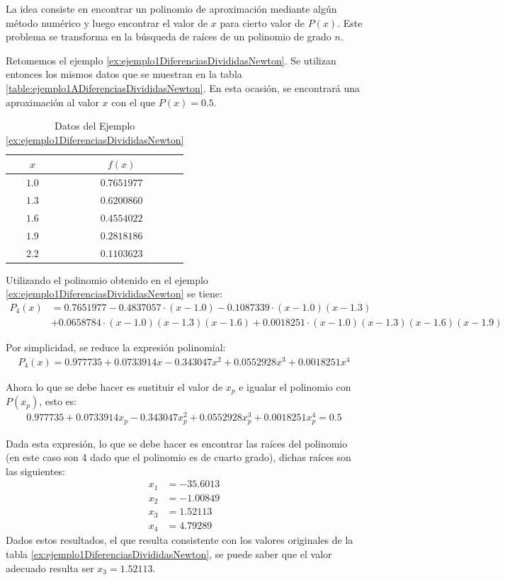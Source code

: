 La idea consiste en encontrar un polinomio de aproximación mediante algún método numérico y luego encontrar el valor de $x$ para cierto valor de $P(x)$. Este
problema se transforma en la búsqueda de raíces de un polinomio de grado $n$.

\begin{example}{\rm
Retomemos el ejemplo \ref{ex:ejemplo1DiferenciasDivididasNewton}. Se utilizan entonces los mismos datos que se muestran en la tabla
\ref{table:ejemplo1ADiferenciasDivididasNewton}. En esta ocasión, se encontrará una aproximación al valor $x$ con el que $P(x)=0.5$.
\begin{table}[H]
		\centering
      \begin{tabular}{|c|c|}
				\hline 
				\rowcolor[gray]{0.9} $x$ & $f(x)$\\ \hline
					$1.0$ & $0.7651977$ \\
					$1.3$ & $0.6200860$ \\
					$1.6$ & $0.4554022$ \\
					$1.9$ & $0.2818186$ \\
					$2.2$ & $0.1103623$ \\
				\hline
      	\end{tabular}
      	\caption{Datos del Ejemplo \ref{ex:ejemplo1DiferenciasDivididasNewton}}
	\end{table}
Utilizando el polinomio obtenido en el ejemplo \ref{ex:ejemplo1DiferenciasDivididasNewton} se tiene:
\begin{align*}
	P_4(x) &= 0.7651977 - 0.4837057\cdot(x-1.0) - 0.1087339\cdot(x-1.0)(x-1.3)\\ 
	&+ 0.0658784\cdot(x-1.0)(x-1.3)(x-1.6) + 0.0018251\cdot(x-1.0)(x-1.3)(x-1.6)(x-1.9)
\end{align*}

Por simplicidad, se reduce la expresión polinomial:
\begin{align*}
	P_4(x)=0.977735 + 0.0733914 x - 0.343047 x^2 + 0.0552928 x^3 + 0.0018251 x^4
\end{align*}

Ahora lo que se debe hacer es sustituir el valor de $x_p$ e igualar el polinomio con $P(x_p)$, esto es:
\begin{align*}
	0.977735 + 0.0733914 x_p - 0.343047 x_p^2 + 0.0552928 x_p^3 + 0.0018251 x_p^4 = 0.5
\end{align*}

Dada esta expresión, lo que se debe hacer es encontrar las raíces del polinomio (en este caso son 4 dado que el polinomio 
es de cuarto grado), dichas raíces son las siguientes:
\begin{align*}
	x_1 &= -35.6013\\
	x_2 &= -1.00849\\
	x_3 &= 1.52113\\
	x_4 &= 4.79289
\end{align*}
Dados estos resultados, el que resulta consistente con los valores originales de la tabla \ref{ex:ejemplo1DiferenciasDivididasNewton}, 
se puede saber que el valor adecuado resulta ser $x_3 = 1.52113$.
}\end{example}


